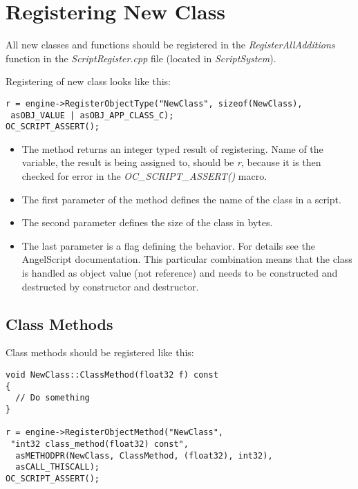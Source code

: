 \documentclass[a4paper, 12pt]{report}
\begin{document}
\section{Registering New Class}

All new classes and functions should be registered in the \emph{RegisterAllAdditions} function in the \emph{ScriptRegister.cpp} file (located in \emph{ScriptSystem}).

Registering of new class looks like this:

\begin{verbatim}
r = engine->RegisterObjectType("NewClass", sizeof(NewClass),
 asOBJ_VALUE | asOBJ_APP_CLASS_C);
OC_SCRIPT_ASSERT();
\end{verbatim}

\begin{itemize}
\item
The method returns an integer typed result of registering. Name of the variable, the result is being assigned to, should be \emph{r}, because it is then checked for error in the \emph{OC\_SCRIPT\_ASSERT()} macro.

\item
The first parameter of the method defines the name of the class in a script.

\item
The second parameter defines the size of the class in bytes.

\item
The last parameter is a flag defining the behavior. For details see the AngelScript documentation. This particular combination means that the class is handled as object value (not reference) and needs to be constructed and destructed by constructor and destructor.
\end{itemize}

\subsection{Class Methods}
Class methods should be registered like this:

\begin{verbatim}
void NewClass::ClassMethod(float32 f) const
{
  // Do something
}

r = engine->RegisterObjectMethod("NewClass",
 "int32 class_method(float32) const", 
  asMETHODPR(NewClass, ClassMethod, (float32), int32),
  asCALL_THISCALL);
OC_SCRIPT_ASSERT();
\end{verbatim}
\end{document}
